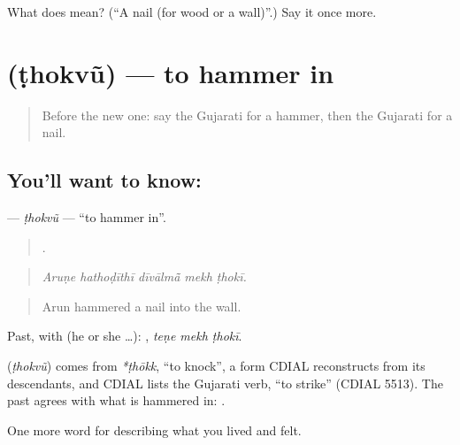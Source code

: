 \begin{tcolorbox}[breakable,colback=teal!4,colframe=teal!35!black,title={Before you move on}]
What does  mean? (\textquotedblleft{}A nail (for wood or a wall)\textquotedblright{}.) Say it once more.
\end{tcolorbox}
\section[\texorpdfstring{\gu{ઠોકવું} (ṭhokvũ)}{ઠોકવું (ṭhokvũ)}]{ (ṭhokvũ) — to hammer in}

\label{lesson:GU-C502-thokvu}



\begin{quote}
Before the new one: say the Gujarati for a hammer, then the Gujarati for a nail.
\end{quote}

\subsection*{You'll want to know: }
\textbf{} — \emph{ṭhokvũ} — \textquotedblleft{}to hammer in\textquotedblright{}.

\begin{quote}
    .
\end{quote}

\begin{quote}
\emph{Aruṇe hathoḍīthī dīvālmā̃ mekh ṭhokī.}
\end{quote}

\begin{quote}
Arun hammered a nail into the wall.
\end{quote}

Past, with  (he or she …):   , \emph{teṇe mekh ṭhokī}.

\begin{cousinweb}
\textbf{} (\emph{ṭhokvũ}) comes from \emph{*ṭhōkk}, \textquotedblleft{}to knock\textquotedblright{}, a form CDIAL reconstructs from its descendants, and CDIAL lists the Gujarati verb, \textquotedblleft{}to strike\textquotedblright{} (CDIAL 5513). The past agrees with what is hammered in: \textbf{ }.
\end{cousinweb}

\begin{grammarlens}[title={What you've built}]
One more word for describing what you lived and felt.
\end{grammarlens}


